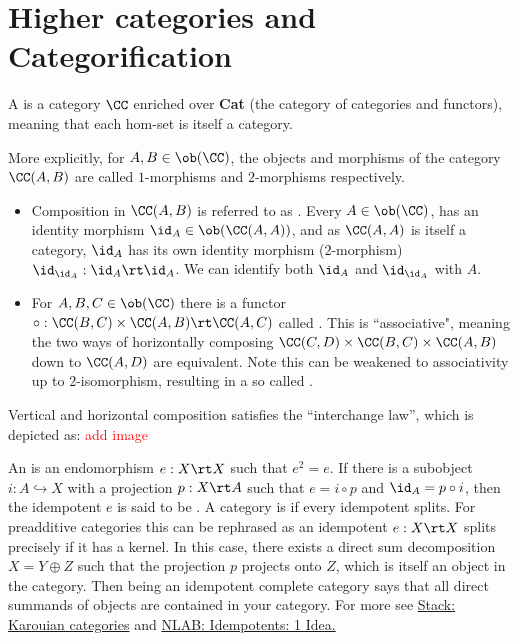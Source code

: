 \section{Higher categories and Categorification}\label{higher_cats_sec}

\begin{definition} A  is a category $\CC$ enriched over \textbf{Cat} (the category of categories and functors), meaning that each hom-set is itself a category.\bb

\nt More explicitly, for $A,B\in \ob(\CC)$, the objects and morphisms of the category $\CC(A,B)$ are called $1$-morphisms and $2$-morphisms respectively.
\begin{itemize}
  \item Composition in $\CC(A,B)$ is referred to as . Every $A\in \ob(\CC)$, has an identity morphism $\id_A\in \ob(\CC(A,A))$, and as $\CC(A,A)$ is itself a category, $\id_A$ has its own identity morphism ($2$-morphism) $\id_{\id_A}:\id_A\rt \id_A$. We can identify both $\id_A$ and $\id_{\id_A}$ with $A$. 
  \item For $A,B,C\in \ob(\CC)$ there is a functor $\circ:\CC(B,C)\times \CC(A,B)\rt \CC(A,C)$ called . This is ``associative", meaning the two ways of horizontally composing $\CC(C,D)\times \CC(B,C)\times \CC(A,B)$ down to $\CC(A,D)$ are equivalent. Note this can be weakened to associativity up to $2$-isomorphism, resulting in a so called .
\end{itemize}
Vertical and horizontal composition satisfies the ``interchange law'', which is depicted as:\bb
\textcolor{red}{add image}
\end{definition}

\nt An  is an endomorphism $e:X\rt X$ such that $e^2=e$. If there is a subobject $i:A\hookrightarrow X$ with a projection $p:X\rt A$ such that $e=i\circ p$ and $\id_A=p\circ i$, then the idempotent $e$ is said to be . A category is  if every idempotent splits. For preadditive categories this can be rephrased as an idempotent $e:X\rt X$ splits precisely if it has a kernel. In this case, there exists a direct sum decomposition $X=Y\oplus Z$ such that the projection $p$ projects onto $Z$, which is itself an object in the category. Then being an idempotent complete category says that all direct summands of objects are contained in your category. For more see \hyperlink{https://stacks.math.columbia.edu/tag/09SF}{Stack: Karouian categories} and \hyperlink{https://ncatlab.org/nlab/show/idempotent}{NLAB: Idempotents: 1 Idea.}\bb
  
